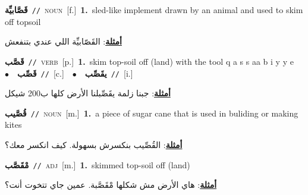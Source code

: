 \documentclass[10pt,a4paper,twoside]{article} %
\begin{document}
\begin{multicols}{2}
{\setlength\topsep{0pt}\textbf{\foreignlanguage{arabic}{قَصَّابيِّة}}\ {\color{gray}\texttt{//}\color{black}}\ \textsc{noun}\ [f.]\ \textbf{1.}~sled-like implement drawn by an animal and used to skim off topsoil\  \begin{flushright}\color{gray}\foreignlanguage{arabic}{\textbf{\underline{\foreignlanguage{arabic}{أمثلة}}}: القَصّابيِّة اللي عندي بتنفعش}\end{flushright}\color{black}} \vspace{2mm}

{\setlength\topsep{0pt}\textbf{\foreignlanguage{arabic}{قَصَّب}}\ {\color{gray}\texttt{//}\color{black}}\ \textsc{verb}\ [p.]\ \textbf{1.}~skim top-soil off (land) with the tool q a s s aa b i y y e\ \ $\bullet$\ \ \setlength\topsep{0pt}\textbf{\foreignlanguage{arabic}{قَصِّب}}\ {\color{gray}\texttt{//}\color{black}}\ [c.]\ \ $\bullet$\ \ \setlength\topsep{0pt}\textbf{\foreignlanguage{arabic}{يقَصِّب}}\ {\color{gray}\texttt{//}\color{black}}\ [i.]\  \begin{flushright}\color{gray}\foreignlanguage{arabic}{\textbf{\underline{\foreignlanguage{arabic}{أمثلة}}}: جبنا زلمة يقَصِّبلنا الأرض كلها ب200 شيكل}\end{flushright}\color{black}} \vspace{2mm}

{\setlength\topsep{0pt}\textbf{\foreignlanguage{arabic}{قُصَّيب}}\ {\color{gray}\texttt{//}\color{black}}\ \textsc{noun}\ [m.]\ \textbf{1.}~a piece of sugar cane that is used in buliding or making kites\  \begin{flushright}\color{gray}\foreignlanguage{arabic}{\textbf{\underline{\foreignlanguage{arabic}{أمثلة}}}: القُصِّيب بنكسرش بسهولة. كيف انكسر معك؟}\end{flushright}\color{black}} \vspace{2mm}

{\setlength\topsep{0pt}\textbf{\foreignlanguage{arabic}{مْقَصَّب}}\ {\color{gray}\texttt{//}\color{black}}\ \textsc{adj}\ [m.]\ \textbf{1.}~skimmed top-soil off (land)\  \begin{flushright}\color{gray}\foreignlanguage{arabic}{\textbf{\underline{\foreignlanguage{arabic}{أمثلة}}}: هاي الأرض مش شكلها مْقَصَّبة. عمين جاي تتخوت أنت؟}\end{flushright}\color{black}} \vspace{2mm}


\end{multicols}
\end{document}
